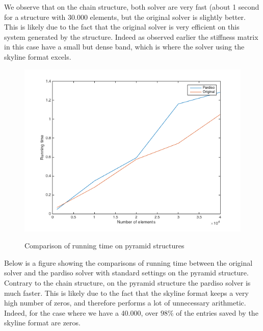 \documentclass[11pt]{article}
\begin{document}
We observe that on the chain structure, both solver are very fast (about 1 second for a structure with 30.000 elements, but the original solver is slightly better. This is likely due to the fact that the original solver is very efficient on this system generated by the structure. Indeed as observed earlier the stiffness matrix in this case have a small but dense band, which is where the solver using the skyline format excels.


\begin{figure}[H]
\begin{center}

\caption{Comparison of running time on pyramid structures}
\includegraphics[width=12cm]{chainplot}
\label{fig:pyr_comp}
\end{center}
\end{figure}

Below is a figure showing  the comparisons of running time between the original solver and the pardiso solver with standard settings on the pyramid structure. \\

Contrary to the chain structure, on the pyramid structure the pardiso solver is much faster. This is likely due to the fact that the skyline format keeps a very high number of zeros, and therefore performs a lot of unnecessary arithmetic. Indeed, for the case where we have a 40.000, over $98\%$ of the entries saved by the skyline format are zeros.
\end{document}
